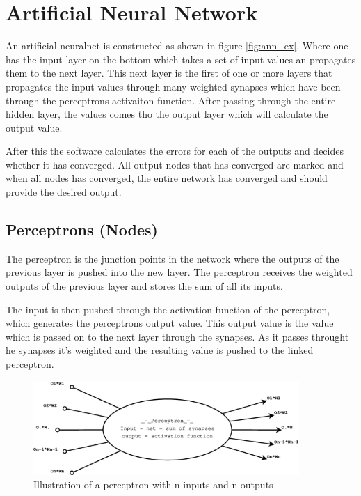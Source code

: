 
\chapter{Artificial Neural Network}
An artificial \gls{neuralnet} is constructed as shown in figure
\ref{fig:ann_ex}. Where one has the input layer on the bottom which takes a set
of input values an propagates them to the next layer.  This next layer is the
first of one or more layers that propagates the input values through many
weighted \gls{synapse}s which have been through the \gls{perceptron}s activaiton
function.  After passing through the entire hidden layer, the values comes tho
the output layer which will calculate the output value.

After this the software calculates the errors for each of the outputs and
decides whether it has converged.  All output nodes that has converged are
marked and when all nodes has converged, the entire network has converged and
should provide the desired output.

\section{Perceptrons (Nodes)}
The \gls{perceptron} is the junction points in the network where the outputs of
the previous layer is pushed into the new layer. The \gls{perceptron} receives the
weighted outputs of the previous layer and stores the sum of all its inputs.

The input is then pushed through the activation function of the \gls{perceptron},
which generates the \gls{perceptron}s output value. This output value is the value
which is passed on to the next layer through the \gls{synapse}s. As it passes throught
he \gls{synapse}s it's weighted and the resulting value is pushed to the linked 
\gls{perceptron}.


\begin{figure}[b]
\centering
\includegraphics[width={0.9\textwidth}]{pictures/perceptron}
\caption{Illustration of a \gls{perceptron} with n inputs and n outputs}
\label{fig:perceptron}
\end{figure}

